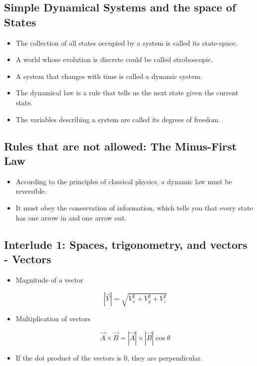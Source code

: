 \documentclass[../main.tex]{subfiles}
\begin{document}
\subsection{Simple Dynamical Systems and the space of States}
\begin{itemize}
    \item The collection of all states occupied by a system is called its
        state-space. 

    \item A world whose evolution is discrete could be called stroboscopic.

    \item A system that changes with time is called a dynamic system.

    \item The dynamical law is a rule that tells us the next state given the
        current state.

    \item The variables describing a system are called its degrees of freedom.

\end{itemize}

\subsection{Rules that are not allowed: The Minus-First Law}
\begin{itemize}
    \item According to the principles of classical physics, a dynamic law must
        be reversible.

    \item It must obey the conservation of information, which tells you that
        every state has one arrow in and one arrow out.

\end{itemize}

\subsection{Interlude 1: Spaces, trigonometry, and vectors - Vectors}
\begin{itemize}
    \item Magnitude of a vector 

        \begin{equation}
            |\vec{V}| = \sqrt{V_{x}^2 + V_{y}^2 + V_{z}^2}  
        \end{equation}

    \item Multiplication of vectors

        \begin{equation}
            \vec{A}\times \vec{B} = |\vec{A}|\times |\vec{B}| \cos{\theta}
        \end{equation}

    \item If the dot product of the vectors is $0$, they are perpendicular.
\end{itemize}
\end{document}
